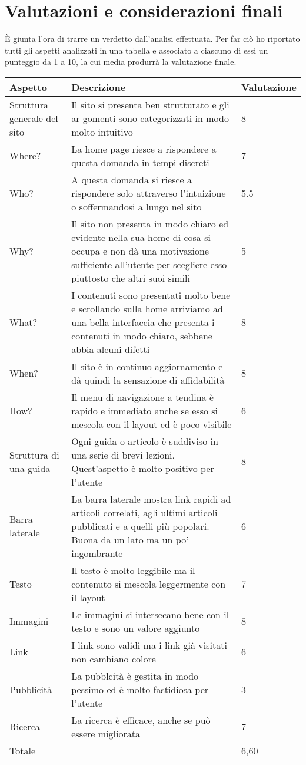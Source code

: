 \section{Valutazioni e considerazioni finali}

È giunta l'ora di trarre un verdetto dall'analisi effettuata. Per far ciò ho riportato tutti gli aspetti analizzati in una tabella e associato a ciascuno di essi un punteggio da 1 a 10, la cui media produrrà la valutazione finale.



\begin{longtable}{| p{4.5cm} | p{4.5cm} | l |}

\hline
\hline
\textbf{Aspetto} & \textbf{Descrizione} & \textbf{Valutazione} \\
\hline
\hline

Struttura generale del sito & Il sito si presenta ben strutturato e gli ar gomenti sono categorizzati in modo molto intuitivo & 8 \\
\hline
Where? & La home page riesce a rispondere a questa domanda in tempi discreti & 7 \\
\hline
Who? & A questa domanda si riesce a rispondere solo attraverso l'intuizione o soffermandosi a lungo nel sito & 5.5 \\
\hline
Why? & Il sito non presenta in modo chiaro ed evidente nella sua home di cosa si occupa e non dà una motivazione sufficiente all'utente per scegliere esso piuttosto che altri suoi simili & 5 \\
\hline
What? & I contenuti sono presentati molto bene e scrollando sulla home arriviamo ad una bella interfaccia che presenta i contenuti in modo chiaro, sebbene abbia alcuni difetti & 8 \\
\hline
When? & Il sito è in continuo aggiornamento e dà quindi la sensazione di affidabilità & 8 \\
\hline
How? & Il menu di navigazione a tendina è rapido e immediato anche se esso si mescola con il layout ed è poco visibile & 6 \\
\hline
Struttura di una guida & Ogni guida o articolo è suddiviso in una serie di brevi lezioni. Quest'aspetto è molto positivo per l'utente & 8 \\
\hline
Barra laterale & La barra laterale mostra link rapidi ad articoli correlati, agli ultimi articoli pubblicati e a quelli più popolari. Buona da un lato ma un po' ingombrante & 6 \\
\hline
Testo & Il testo è molto leggibile ma il contenuto si mescola leggermente con il layout & 7 \\
\hline
Immagini & Le immagini si intersecano bene con il testo e sono un valore aggiunto & 8 \\
\hline
Link & I link sono validi ma i link già visitati non cambiano colore & 6 \\
\hline
Pubblicità & La pubblcità è gestita in modo pessimo ed è molto fastidiosa per l'utente & 3 \\
\hline
Ricerca & La ricerca è efficace, anche se può essere migliorata & 7 \\
\hline
\hline
Totale & & 6,60 \\
\hline
\hline

\end{longtable}
